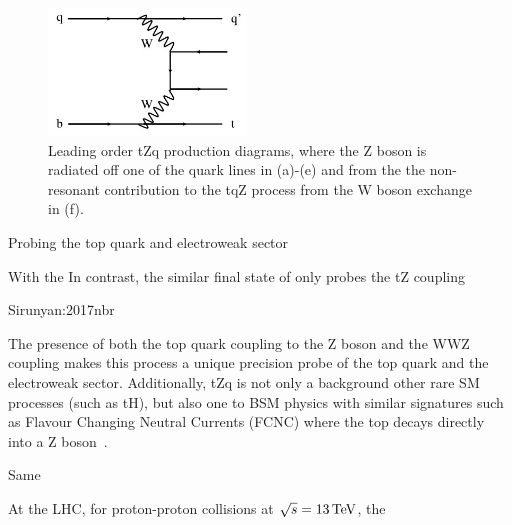 \begin{figure}[p]
\includegraphics[width=0.47\textwidth]{figs/top-physics/tZq_feyn6.jpg}
\caption{Leading order tZq production diagrams, where the Z boson is radiated off one of the quark lines in (a)-(e) and from the the non-resonant contribution to the tqZ process from the W boson exchange in (f).}
\label{fig:feyn_tZq}
\end{figure}

Probing the top quark and electroweak sector 

With the 
In contrast, the similar final state of \ttZ only probes the tZ coupling

Sirunyan:2017nbr

The presence of both the top quark coupling to the Z boson and the WWZ coupling makes this process a unique precision probe of the top quark and the electroweak sector.
Additionally, tZq is not only a background other rare SM processes (such as tH), but also one to BSM physics with similar signatures such as Flavour Changing Neutral Currents (FCNC) where the top decays directly into a Z boson~\cite{AguilarSaavedra:2004wm}.	

Same 

At the LHC, for proton-proton collisions at $\sqrt{s} = 13 \,\text{Te\hspace{-.08em}V}$, the 

%
%
%

